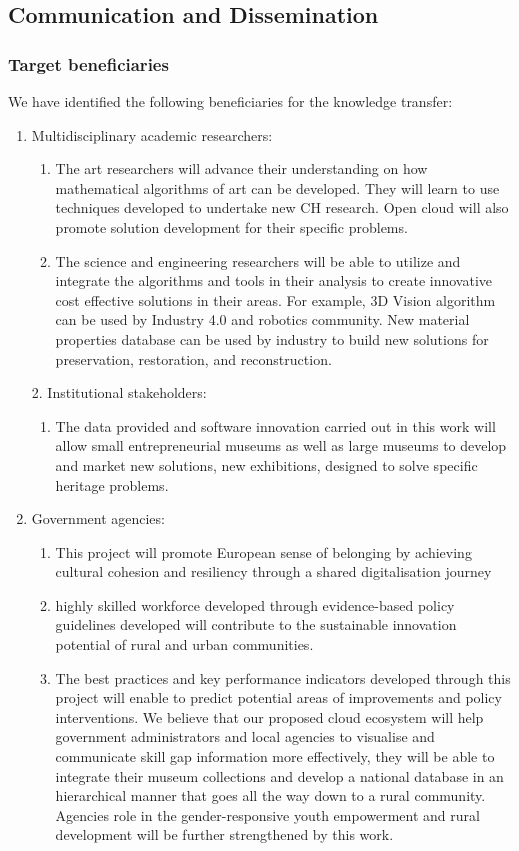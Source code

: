 \subsection{Communication and Dissemination}
\subsubsection{Target beneficiaries}
We have identified the following beneficiaries for the knowledge transfer:
\begin{enumerate}[nosep,left=1mm]
\item Multidisciplinary academic researchers:
\begin{enumerate}[nosep]
\item The art researchers will advance their understanding on how mathematical algorithms of art can be developed. They will learn to use techniques developed to undertake new CH research. Open cloud will also promote solution development for their specific problems.
\item The science and engineering researchers will be able to utilize and integrate the algorithms and tools in their analysis to create innovative cost effective solutions in their areas. For example, 3D Vision algorithm can be used by Industry 4.0 and robotics community. New material properties database can be used by industry to build new solutions for preservation, restoration, and reconstruction.
\end{enumerate}
2. Institutional stakeholders:
\begin{enumerate}[nosep]
\item The data provided and software innovation carried out in this work will allow small entrepreneurial museums as well as large museums to develop and market new solutions, new exhibitions, designed to solve specific heritage problems.
\end{enumerate}
\item Government agencies:
\begin{enumerate}[nosep]
\item This project will promote European sense of belonging by achieving cultural cohesion and resiliency through a shared digitalisation journey
\item highly skilled workforce developed through evidence-based policy guidelines developed will contribute to the sustainable innovation potential of rural and urban communities.
\item The best practices and key performance indicators developed through this project will enable to predict potential areas of improvements and policy interventions. We believe that our proposed cloud ecosystem will help government administrators and local agencies to visualise and communicate skill gap information more effectively, they will be able to integrate their museum collections and develop a national database in an hierarchical manner that goes all the way down to a rural community. Agencies role in the gender-responsive youth empowerment and rural development will be further strengthened by this work.
\end{enumerate}
\end{enumerate}

